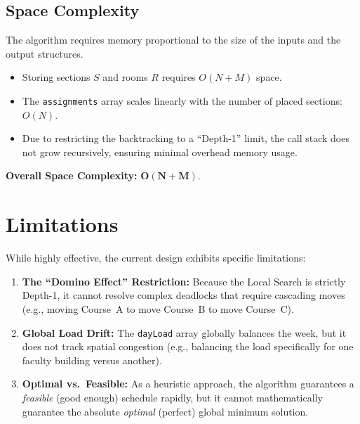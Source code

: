 \documentclass[12pt, a4paper]{article}
\begin{document}
\subsection{Space Complexity}

The algorithm requires memory proportional to the size of the inputs and the output
structures.

\begin{itemize}[noitemsep, topsep=4pt]
    \item Storing sections $S$ and rooms $R$ requires $O(N + M)$ space.

    \item The \texttt{assignments} array scales linearly with the number of placed
          sections: $O(N)$.

    \item Due to restricting the backtracking to a ``Depth-1'' limit, the call stack
          does not grow recursively, ensuring minimal overhead memory usage.
\end{itemize}

\medskip
\noindent\textbf{Overall Space Complexity:} $\mathbf{O(N + M)}$.

\section{Limitations}

While highly effective, the current design exhibits specific limitations:

\begin{enumerate}[label=\arabic*., topsep=4pt]
    \item \textbf{The ``Domino Effect'' Restriction:} Because the Local Search is
          strictly Depth-1, it cannot resolve complex deadlocks that require cascading
          moves (e.g., moving Course~A to move Course~B to move Course~C).

    \item \textbf{Global Load Drift:} The \texttt{dayLoad} array globally balances the
          week, but it does not track spatial congestion (e.g., balancing the load
          specifically for one faculty building versus another).

    \item \textbf{Optimal vs.\ Feasible:} As a heuristic approach, the algorithm
          guarantees a \textit{feasible} (good enough) schedule rapidly, but it cannot
          mathematically guarantee the absolute \textit{optimal} (perfect) global
          minimum solution.
\end{enumerate}
\end{document}
